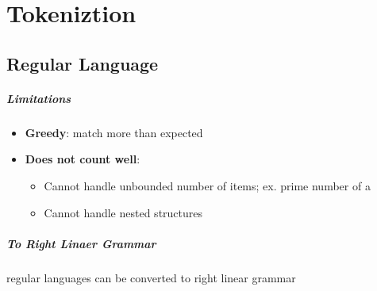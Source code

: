 \chapter{Tokeniztion}

\section{Regular Language}

  \paragraph{Limitations}
  \begin{itemize}
    \item \textbf{Greedy}: match more than expected
    \item \textbf{Does not count well}:
    \begin{itemize}
      \item Cannot handle unbounded number of items; ex. prime number of a
      \item Cannot handle nested structures
    \end{itemize}
  \end{itemize}

  \paragraph{To Right Linaer Grammar} regular languages can be converted to
  right linear grammar
